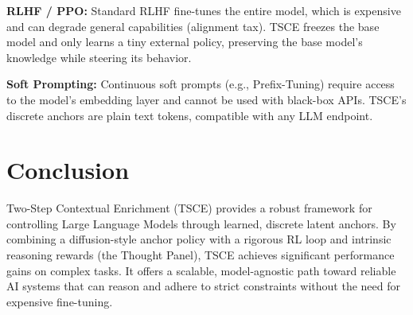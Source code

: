 \documentclass[11pt]{article}
\begin{document}
\textbf{RLHF / PPO:} Standard RLHF fine-tunes the entire model, which is expensive and can degrade general capabilities (alignment tax). TSCE freezes the base model and only learns a tiny external policy, preserving the base model's knowledge while steering its behavior.

\textbf{Soft Prompting:} Continuous soft prompts (e.g., Prefix-Tuning) require access to the model's embedding layer and cannot be used with black-box APIs. TSCE's discrete anchors are plain text tokens, compatible with any LLM endpoint.

\section{Conclusion}
Two-Step Contextual Enrichment (TSCE) provides a robust framework for controlling Large Language Models through learned, discrete latent anchors. By combining a diffusion-style anchor policy with a rigorous RL loop and intrinsic reasoning rewards (the Thought Panel), TSCE achieves significant performance gains on complex tasks. It offers a scalable, model-agnostic path toward reliable AI systems that can reason and adhere to strict constraints without the need for expensive fine-tuning.
\end{document}
